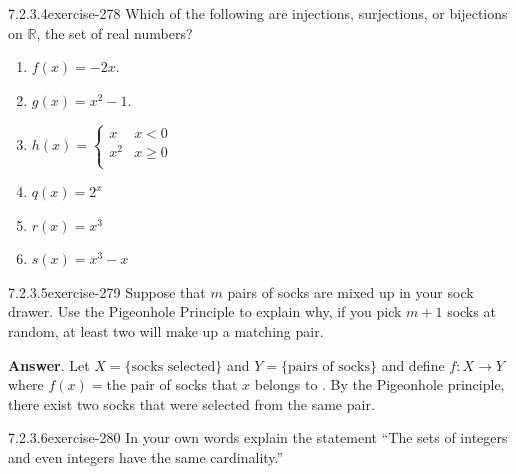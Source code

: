 \documentclass[twoside,10pt,]{book}
\numberwithin{equation}{section}
\begin{document}
\begin{divisionsolution}{7.2.3.4}{}{exercise-278}%
\hypertarget{p-2364}{}%
Which of the following are injections, surjections, or bijections on \(\mathbb{R}\), the set of real numbers?%
\par
\hypertarget{p-2365}{}%
\leavevmode%
\begin{enumerate}[label=(\alph*)]
\item\hypertarget{li-1216}{}\hypertarget{p-2366}{}%
\(f(x) = -2x\).%
\item\hypertarget{li-1217}{}\hypertarget{p-2367}{}%
\(g(x) = x^2- 1\).%
\item\hypertarget{li-1218}{}\hypertarget{p-2368}{}%
\(h(x)=\left\{ \begin{array}{cc}
x & x < 0 \\
x^2 & x\geq 0 \\
\end{array} \right.\)%
\item\hypertarget{li-1219}{}\hypertarget{p-2369}{}%
\(q(x)=2^x\)%
\item\hypertarget{li-1220}{}\hypertarget{p-2370}{}%
\(r(x) =x^3\)%
\item\hypertarget{li-1221}{}\hypertarget{p-2371}{}%
\(s(x) = x^3-x\)%
\end{enumerate}
%
\end{divisionsolution}%
\begin{divisionsolution}{7.2.3.5}{}{exercise-279}%
\hypertarget{p-2372}{}%
Suppose that \(m\) pairs of socks are mixed up in your sock drawer. Use the Pigeonhole Principle to explain why, if you pick \(m + 1\) socks at random, at least two will make up a matching pair.%
\par\smallskip%
\noindent\textbf{Answer}.\quad%
\hypertarget{p-2373}{}%
Let \(X=\{\textrm{socks selected}\}\) and \(Y=\{\textrm{pairs of socks}\}\) and define \(f:X \to Y\) where \(f(x) =\)the pair of socks that \(x\) belongs to . By the Pigeonhole principle, there exist two socks that were selected from the same pair.%
\end{divisionsolution}%
\begin{divisionsolution}{7.2.3.6}{}{exercise-280}%
\hypertarget{p-2374}{}%
In your own words explain the statement ``The sets of integers and even integers have the same cardinality.''%
\end{divisionsolution}%
\end{document}
